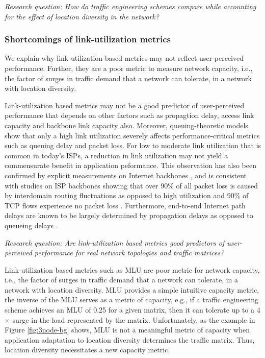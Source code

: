 \emph{Research question: How do traffic engineering schemes compare while accounting for the effect of location diversity in the network?}

\subsubsection{Shortcomings of link-utilization metrics}
\label{sec:bg-poormlu}

We explain why link-utilization based metrics may not reflect user-perceived performance. Further, they are a poor metric to measure network capacity, i.e., the factor of surges in traffic demand that a network can tolerate, in a network with location diversity.

Link-utilization based metrics may not be a good predictor of user-perceived performance that depends on other factors such as propagtion delay, access link capacity and backbone link capacity also. Moreover, queuing-theoretic models show that only a high link utilization severely affects performance-critical metrics such as queuing delay and packet loss. For low to moderate link utilization that is common in today's ISPs, a reduction in link utilization may not yield a commensurate benefit in application peformance. This observation has also been confirmed by explicit measurements on Internet backbones \cite{ExpRouterBuffer}, and is consistent with studies on ISP backbones showing that over 90\% of all packet loss is caused by interdomain routing fluctuations as opposed to high utilization \cite{SprintStudy} and 90\% of TCP flows experience no packet loss \cite{SprintBackbone}. Furthermore, end-to-end Internet path delays are known to be largely determined by propagation delays as opposed to queueing delays \cite{SprintBackbone,SingleHopDelay}.

\emph{Research question: Are link-utilization based metrics good predictors of user-perceived performance for real network topologies and traffic matrices?}

Link-utilization based metrics such as MLU are poor metric for network capacity, i.e., the factor of surges in traffic demand that a network can tolerate, in a network with location diversity. MLU provides a simple intuitive capacity metric, the inverse of the MLU serves as a metric of capacity, e.g., if a traffic engineering scheme achieves an MLU of 0.25 for a given matrix, then it can tolerate up to a 4$\times$ surge in the load represented by the matrix. Unfortunately, as the example in Figure \ref{fig:3node-bg} shows, MLU is not a meaningful metric of capacity when application adaptation to location diversity determines the traffic matrix. Thus, location diversity necessitates a new capacity metric.

